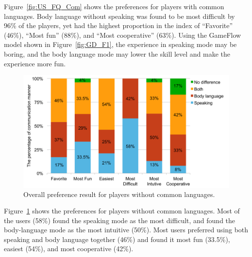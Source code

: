 Figure~\ref{fig:US_FQ_Com} shows the preferences for players with common languages. 
Body language without speaking was found to be most difficult by 96\% of the players, yet had the highest proportion in the index of ``Favorite'' (46\%), ``Most fun'' (88\%), and ``Most cooperative'' (63\%). Using the GameFlow model shown in Figure~\ref{fig:GD_F1}, the experience in speaking mode may be boring, and the body language mode may lower the skill level and make the experience more fun.




\begin{figure}[!t]
\centering
\includegraphics[width=0.9\columnwidth]{Figures/US_FQ_Dif.pdf}
\caption{Overall preference result for players without common languages.}
\label{fig:US_FQ_Dif}
\end{figure}

Figure~\ref{fig:US_FQ_Dif} shows the preferences for players without common languages.
Most of the users (58\%) found the speaking mode as the most difficult, and found the body-language mode as the most intuitive (50\%). Most users preferred using both speaking and body language together (46\%) and found it most fun (33.5\%), easiest (54\%), and most cooperative (42\%).


